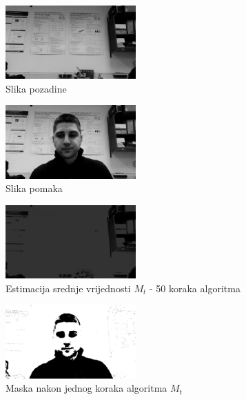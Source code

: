 \documentclass[a4paper,twocolumn]{article}
\begin{document}
\begin{figure}[bp!]
\begin{center}
\includegraphics[width=5cm]{background.jpg}
\caption{Slika pozadine}
\end{center}
\end{figure}
\begin{figure}[bp!]
\begin{center}
\includegraphics[width=5cm]{foreground.jpg}
\caption{Slika pomaka}
\end{center}
\end{figure}
\begin{figure}[bp!]
\begin{center}
\includegraphics[width=5cm]{modeEstimation.jpg}
\caption{Estimacija srednje vrijednosti \(M_t\) - 50 koraka algoritma}
\end{center}
\end{figure}
\begin{figure}[bp!]
\begin{center}
\includegraphics[width=5cm]{sigmadeltamask.jpg}
\caption{Maska nakon jednog koraka algoritma \(M_t\)}
\end{center}
\end{figure}
\end{document}
